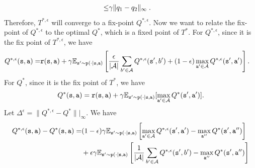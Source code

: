 \begin{advanced}
\begin{align*}
    \leq & \gamma\|q_1-q_2\|_\infty\;.
\end{align*}
Therefore, $T^{*,\epsilon}$ will converge to a fix-point $Q^{*,\epsilon}$. Now we want to relate the fix-point of $Q^{*,\epsilon}$ to the optimal $Q^*$, which is a fixed point of $T^*$.
For $Q^{*,\epsilon}$, since it is the fix point of $T^{*,\epsilon}$, we have
\begin{align*}
  Q^{*,\epsilon}({\tt s},{\tt a}) =&
   {\tt r}({\tt s},{\tt a})+\gamma \mathbb{E}_{{\tt s}'\sim{\tt p}(\cdot|{\tt s},{\tt a})}\left[ \frac{\epsilon}{|\mathcal{A}|}\sum_{b'\in\mathcal{A}} Q^{*,\epsilon} ({\tt s}',b')+ (1-\epsilon)\max_{{\tt a}'\in\mathcal{A}}Q^{*,\epsilon} ({\tt s}',{\tt a}')\right] .
\end{align*}
For $Q^{*}$, since it is the fix point of $T^{*}$, we have
\[
  Q^{*}({\tt s},{\tt a}) = {\tt r}({\tt s},{\tt a})+\gamma \mathbb{E}_{{\tt s}'\sim{\tt p}(\cdot|{\tt s},{\tt a})}[\max_{{\tt a}'\in\mathcal{A}}Q^{*}({\tt s}',{\tt a}')].
\]
Let $\Delta^\epsilon=\|Q^{*,\epsilon}-Q^*\||_\infty$. We have
\begin{align*}
    Q^{*,\epsilon}(\state,\action) -Q^{*}(\state,\action) =& %
    (1-\epsilon)\discount \E_{\state'\sim\transitionprob(\cdot|\state,\action)}\left[\max_{\action'\in\Actions}Q^{*,\epsilon}(\state',\action')-\max_{\action''}Q^{*}(\state',\action'')\right] \\
    & +\epsilon\discount \E_{\state'\sim\transitionprob(\cdot|\state,\action)}\left[ \frac{1}{|\Actions|}\sum_{b'\in\Actions} Q^{*,\epsilon} (\state',b') - \max_{\action''}Q^{*}(\state',\action'')\right]\\

\end{align*}
\end{advanced}
